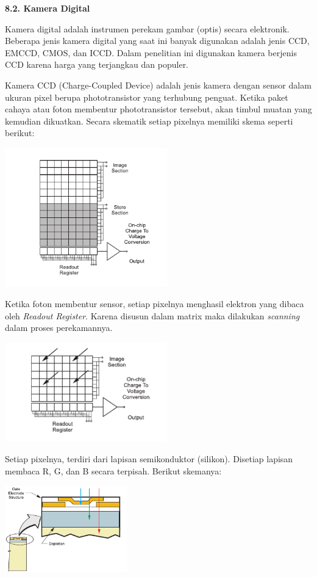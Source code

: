 \documentclass[a4paper,12pt]{article}
\begin{document}
\indent \textbf{8.2. \hspace{8pt} Kamera Digital}

Kamera digital adalah instrumen perekam gambar (optis) secara elektronik.
Beberapa jenis kamera digital yang saat ini banyak digunakan adalah jenis CCD, EMCCD, CMOS, dan ICCD.
Dalam penelitian ini digunakan kamera berjenis CCD karena harga yang terjangkau dan populer.

Kamera CCD (Charge-Coupled Device) adalah jenis kamera dengan sensor dalam ukuran pixel berupa phototransistor yang terhubung penguat.
Ketika paket cahaya atau foton membentur phototransistor tersebut, akan timbul muatan yang kemudian dikuatkan.
Secara skematik setiap pixelnya memiliki skema seperti berikut:
\begin{center}
 \includegraphics[width=200pt]{ccd1}
\end{center}

Ketika foton membentur sensor, setiap pixelnya menghasil elektron yang dibaca oleh \textit{Readout Register}.
Karena disusun dalam matrix maka dilakukan \textit{scanning} dalam proses perekamannya.
\begin{center}
 \includegraphics[width=200pt]{ccd2}
\end{center}
Setiap pixelnya, terdiri dari lapisan semikonduktor (silikon).
Disetiap lapisan membaca R, G, dan B secara terpisah.
Berikut skemanya:\cite{ccd}
\begin{center}
 \includegraphics[width=150pt]{ccd3}
\end{center}
\end{document}
